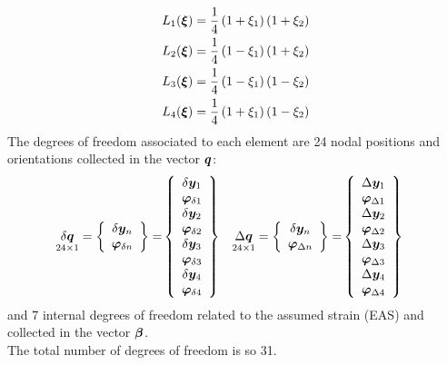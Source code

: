 \begin{subequations}
\begin{align}
L_1(\T{\xi}) & = \frac{1}{4} \plbr{ 1 + \xi_1 } \plbr{ 1 + \xi_2 } \\
L_2(\T{\xi}) & = \frac{1}{4} \plbr{ 1 - \xi_1 } \plbr{ 1 + \xi_2 } \\
L_3(\T{\xi}) & = \frac{1}{4} \plbr{ 1 - \xi_1 } \plbr{ 1 - \xi_2 } \\
L_4(\T{\xi}) & = \frac{1}{4} \plbr{ 1 + \xi_1 } \plbr{ 1 - \xi_2 }
\end{align}
\end{subequations}
The degrees of freedom associated to each element are 24 nodal positions and orientations collected in the vector ${\T{q}}$:
\begin{align}
\underset{24 \times 1}{\delta{\T{q}}}  =
\cubr{\vvect{c}{
\delta \T{y}_{n} \\
\T{\varphi}_{\delta n} \\
}}
 = &
\cubr{\vvect{c}{
\delta \T{y}_{1} \\
\T{\varphi}_{\delta 1} \\
\delta \T{y}_{2} \\
\T{\varphi}_{\delta 2} \\
\delta \T{y}_{3} \\
\T{\varphi}_{\delta 3} \\
\delta \T{y}_{4} \\
\T{\varphi}_{\delta 4} \\
}}
&
\underset{24 \times 1}{\Delta{\T{q}}}  =
\cubr{\vvect{c}{
\delta \T{y}_{n} \\
\T{\varphi}_{\Delta n} \\
}}
 = &
\cubr{\vvect{c}{
\Delta \T{y}_{1} \\
\T{\varphi}_{\Delta 1} \\
\Delta \T{y}_{2} \\
\T{\varphi}_{\Delta 2} \\
\Delta \T{y}_{3} \\
\T{\varphi}_{\Delta 3} \\
\Delta \T{y}_{4} \\
\T{\varphi}_{\Delta 4} \\
}}
\end{align}
and 7 internal degrees of freedom related to the assumed strain (EAS) and collected in the vector $\T{\beta}$.\\
The total number of degrees of freedom is so 31.

